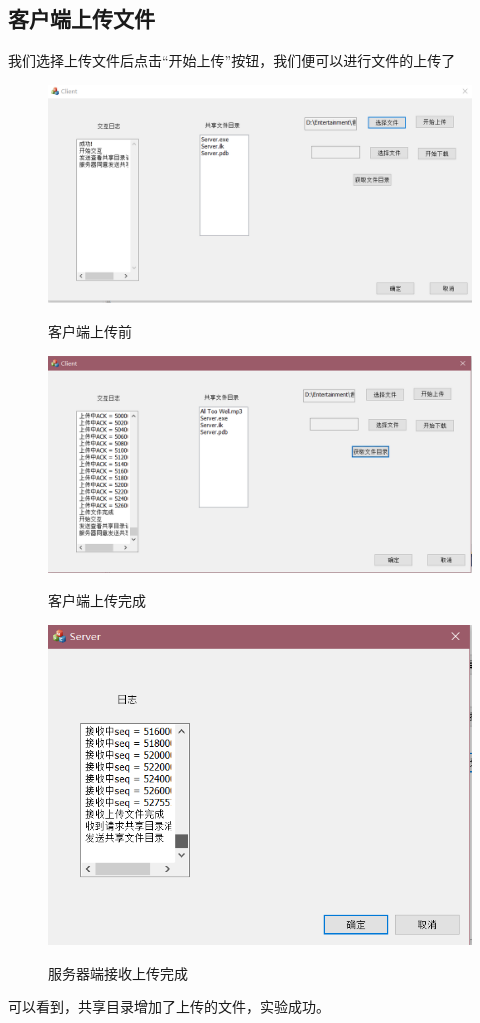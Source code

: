 \subsection{客户端上传文件}
我们选择上传文件后点击“开始上传”按钮，我们便可以进行文件的上传了
\begin{figure}[H]
  \centering
  \includegraphics[width=0.8\linewidth]{figure/client_before_upload}\\
  \caption{客户端上传前}
\end{figure}
\begin{figure}[H]
  \centering
  \includegraphics[width=0.8\linewidth]{figure/client_after_upload}\\
  \caption{客户端上传完成}
\end{figure}


\begin{figure}[H]
  \centering
  \includegraphics[width=0.8\linewidth]{figure/server_upload}\\
  \caption{服务器端接收上传完成}
\end{figure}
可以看到，共享目录增加了上传的文件，实验成功。

